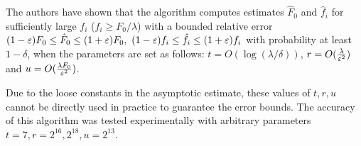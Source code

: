 The authors have shown that the algorithm computes estimates $\hat F_0$ and $\hat f_i$
for sufficiently large $f_i$ ($f_i \geq F_0 / \lambda$) with a bounded relative error 
$(1-\varepsilon)F_0 \leq \hat F_0 \leq (1+\varepsilon)F_0,~ (1-\varepsilon)f_i \leq \hat f_i \leq (1+\varepsilon)f_i$ with
probability at least $1 - \delta$, when the parameters are set as follows: 
$t = O(\log(\lambda/\delta))$, $r = O(\frac{\lambda}{\varepsilon^2})$
and $u = O(\frac{\lambda F_0}{\varepsilon^2})$. 

Due to the loose constants in the asymptotic estimate, these values of $t, r, u$ cannot be
directly used in practice to guarantee the error bounds. The accuracy of this algorithm was tested
experimentally with arbitrary parameters $t=7, r=2^{16}, 2^{18}, u=2^{13}$.
